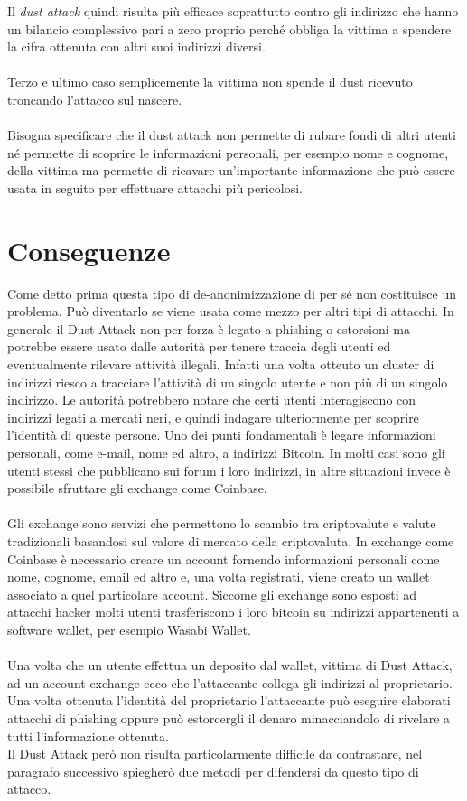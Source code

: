 \FloatBarrier
Il \textit{dust attack} quindi risulta più efficace soprattutto contro gli indirizzo che hanno un bilancio complessivo pari a zero proprio perché obbliga la vittima a spendere la cifra ottenuta con altri suoi indirizzi diversi.\\\\
Terzo e ultimo caso semplicemente la vittima non spende il dust ricevuto troncando l'attacco sul nascere.\\\\
Bisogna specificare che il dust attack non permette di rubare fondi di altri utenti né permette di scoprire le informazioni personali, per esempio nome e cognome, della vittima ma permette di ricavare un'importante informazione che può essere usata in seguito per effettuare attacchi più pericolosi.
\section{Conseguenze}
Come detto prima questa tipo di de-anonimizzazione di per sé non costituisce un problema. Può diventarlo se viene usata come mezzo per altri tipi di attacchi. In generale il Dust Attack non per forza è legato a phishing o estorsioni ma potrebbe essere usato dalle autorità per tenere traccia degli utenti ed eventualmente rilevare attività illegali. Infatti una volta otteuto un cluster di indirizzi riesco a tracciare l'attività di un singolo utente e non più di un singolo indirizzo. Le autorità potrebbero notare che certi utenti interagiscono con indirizzi legati a mercati neri, e quindi indagare ulteriormente per scoprire l'identità di queste persone. Uno dei punti fondamentali è legare informazioni personali, come e-mail, nome ed altro, a indirizzi Bitcoin. In molti casi sono gli utenti stessi che pubblicano sui forum i loro indirizzi, in altre situazioni invece è possibile sfruttare gli exchange come Coinbase.\\\\Gli exchange sono servizi che permettono lo scambio tra criptovalute e valute tradizionali basandosi sul valore di mercato della criptovaluta. In exchange come Coinbase è necessario creare un account fornendo informazioni personali come nome, cognome, email ed altro e, una volta registrati, viene creato un wallet associato a quel particolare account. Siccome gli exchange sono esposti ad attacchi hacker molti utenti trasferiscono i loro bitcoin su indirizzi appartenenti a software wallet, per esempio Wasabi Wallet.\\\\
Una volta che un utente effettua un deposito dal wallet, vittima di Dust Attack, ad un account exchange ecco che l'attaccante collega gli indirizzi al proprietario. Una volta ottenuta l'identità del proprietario l'attaccante può eseguire elaborati attacchi di phishing oppure può estorcergli il denaro minacciandolo di rivelare a tutti l'informazione ottenuta.\\ Il Dust Attack però non risulta particolarmente difficile da contrastare, nel paragrafo successivo spiegherò due metodi per difendersi da questo tipo di attacco.
